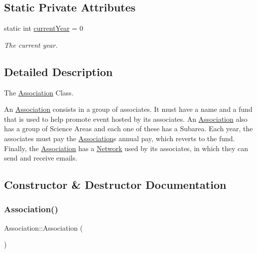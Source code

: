 \subsection*{Static Private Attributes}
\begin{DoxyCompactItemize}
\item 
static int \hyperlink{classAssociation_a22ed128174ec5fd440f8373fe47f42da}{current\+Year} = 0
\begin{DoxyCompactList}\small\item\em The current year. \end{DoxyCompactList}\end{DoxyCompactItemize}


\subsection{Detailed Description}
The \hyperlink{classAssociation}{Association} Class. 

An \hyperlink{classAssociation}{Association} consists in a group of associates. It must have a name and a fund that is used to help promote event hosted by it\textquotesingle{}s associates. An \hyperlink{classAssociation}{Association} also has a group of Science Areas and each one of these has a Subarea. Each year, the associates must pay the \hyperlink{classAssociation}{Association}\textquotesingle{}s annual pay, which reverts to the fund. Finally, the \hyperlink{classAssociation}{Association} has a \hyperlink{classNetwork}{Network} used by it\textquotesingle{}s associates, in which they can send and receive emails. 

\subsection{Constructor \& Destructor Documentation}
\mbox{\label{classAssociation_abf287524f5ab9abf66059e5fa959340b}} 
\subsubsection{\texorpdfstring{Association()}{Association()}\hspace{0.1cm}{\footnotesize\ttfamily [1/3]}}
{\footnotesize\ttfamily Association\+::\+Association (\begin{DoxyParamCaption}{ }\end{DoxyParamCaption})}



